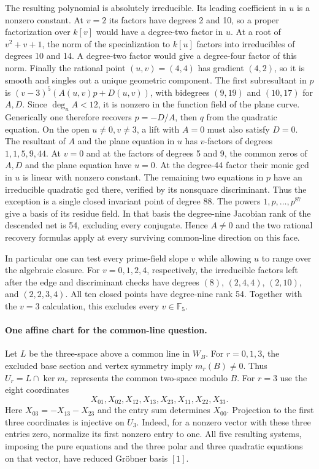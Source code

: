 The resulting polynomial is absolutely irreducible. Its leading
coefficient in \(u\) is a nonzero constant. At \(v=2\) its factors
have degrees 2 and 10, so a proper factorization over \(k[v]\)
would have a degree-two factor in \(u\). At a root of \(v^2+v+1\),
the norm of the specialization to \(k[u]\) factors into irreducibles
of degrees 10 and 14. A degree-two factor would give a degree-four
factor of this norm. Finally the rational point \((u,v)=(4,4)\)
has gradient \((4,2)\), so it is smooth and singles out a unique
geometric component. The first subresultant in \(p\) is
\((v-3)^5(A(u,v)p+D(u,v))\), with bidegrees \((9,19)\) and \((10,17)\)
for \(A,D\). Since \(\deg_u A<12\), it is nonzero in the function
field of the plane curve. Generically one therefore recovers
\(p=-D/A\), then \(q\) from the quadratic equation. On the open \(u\ne0,v\ne3\), a lift with \(A=0\) must also
satisfy \(D=0\). The resultant of \(A\) and the plane equation in
\(u\) has \(v\)-factors of degrees \(1,1,5,9,44\).
At \(v=0\) and at the factors of degrees 5 and 9, the common zeros
of \(A,D\) and the plane equation have \(u=0\). At the degree-44
factor their monic gcd in \(u\) is linear with nonzero constant.
The remaining two equations in \(p\) have an irreducible quadratic
gcd there, verified by its nonsquare discriminant. Thus the exception
is a single closed invariant point of degree 88. The powers
\(1,p,\ldots,p^{87}\) give a basis of its residue field. In that basis
the degree-nine Jacobian rank of the descended net is 54, excluding
every conjugate. Hence \(A\ne0\) and the two rational recovery formulas
apply at every surviving common-line direction on this face.

In particular one can test every prime-field slope \(v\) while allowing
\(u\) to range over the algebraic closure. For \(v=0,1,2,4\), respectively,
the irreducible factors left after the edge and discriminant checks have
degrees \((8)\), \((2,4,4)\), \((2,10)\), and \((2,2,3,4)\).
All ten closed points have degree-nine rank 54. Together with the
\(v=3\) calculation, this excludes every \(v\in\mathbb F_5\).



\paragraph{One affine chart for the common-line question.}
Let \(L\) be the three-space above a common line in \(W_B\).
For \(r=0,1,3\), the excluded base section and vertex symmetry imply
\(m_r(B)\ne0\). Thus \(U_r=L\cap\ker m_r\) represents the common
two-space modulo \(B\). For \(r=3\) use the eight coordinates
\[
       X_{01},X_{02},X_{12},X_{13},X_{23},X_{11},X_{22},X_{33}.
\]
Here \(X_{03}=-X_{13}-X_{23}\) and the entry sum determines \(X_{00}\).
Projection to the first three coordinates is injective on \(U_3\).
Indeed, for a nonzero vector with these three entries zero, normalize
its first nonzero entry to one. All five resulting systems, imposing
the pure equations and the three polar and three quadratic equations
on that vector, have reduced Gröbner basis \([1]\).

